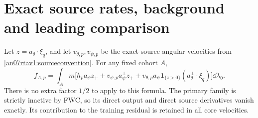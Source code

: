 \documentclass[11pt]{article}
\numberwithin{equation}{section}
\newcommand{\one}{\mathbf1}\newcommand{\Kfun}{\mathsf K}
\begin{document}
\section{Exact source rates, background and leading comparison}
\label{an07rtav1:ratesection}
Let \(z=a_\theta\cdot\xi_q\), and let
\(v_{\theta,p},v_{\psi,p}\) be the exact source angular velocities
from \eqref{an07rtav1:sourceconvention}. For any fixed cohort \(A\),
\begin{equation}
 \dot f_{A,p}=\int_A m\big[
 h_p a_\psi z_++v_{\psi,p}a_\psi^\perp z_+
 +v_{\theta,p}a_\psi\one_{\{z>0\}}
                       (a_\theta^\perp\cdot\xi_q)\big]\dd\lambda_0.
 \label{an07rtav1:exactrate}
\end{equation}
There is no extra factor \(1/2\) to apply to this formula.
The primary family is strictly inactive by FWC, so its direct
output and direct source derivatives vanish exactly. Its contribution
to the training residual is retained in all core velocities.
\end{document}
